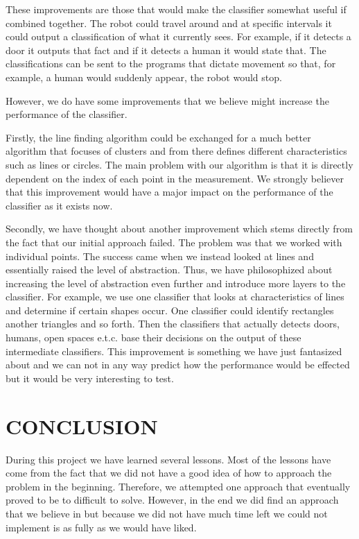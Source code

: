 \documentclass[a4paper, 10pt, conference]{ieeeconf}      %
\begin{document}
These improvements are those that would make the classifier somewhat useful if combined together. The robot could travel around and at specific intervals it could output a classification of what it currently sees. For example, if it detects a door it outputs that fact and if it detects a human it would state that. The classifications can be sent to the programs that dictate movement so that, for example, a human would suddenly appear, the robot would stop.

However, we do have some improvements that we believe might increase the performance of the classifier.

Firstly, the line finding algorithm could be exchanged for a much better algorithm that focuses of clusters and from there defines different characteristics such as lines or circles. The main problem with our algorithm is that it is directly dependent on the index of each point in the measurement. We strongly believer that this improvement would have a major impact on the performance of the classifier as it exists now.

Secondly, we have thought about another improvement which stems directly from the fact that our initial approach failed. The problem was that we worked with individual points. The success came when we instead looked at lines and essentially raised the level of abstraction. Thus, we have philosophized about increasing the level of abstraction even further and introduce more layers to the classifier. For example, we use one classifier that looks at characteristics of lines and determine if certain shapes occur. One classifier could identify rectangles another triangles and so forth. Then the classifiers that actually detects doors, humans, open spaces e.t.c. base their decisions  on the output of these intermediate classifiers. This improvement is something we have just fantasized about and we can not in any way predict how the performance would be effected but it would be very interesting to test.

\section{CONCLUSION}
During this project we have learned several lessons. Most of the lessons have come from the fact that we did not have a good idea of how to approach the problem in the beginning. Therefore, we attempted one approach that eventually proved to be to difficult to solve. However, in the end we did find an approach that we believe in but because we did not have much time left we could not implement is as fully as we would have liked.
\end{document}
